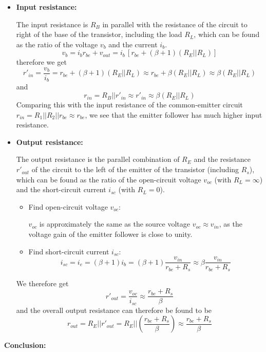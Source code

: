 \begin{itemize}
\begin{itemize}
\item {\bf Input resistance:} 

  The input resistance is $R_B$ in parallel with the resistance of the
  circuit to right of the base of the transistor, including the load 
  $R_L$, which can be found as the ratio of the voltage $v_b$ and the 
  current $i_b$. 
  \[
  v_b=i_b r_{be}+v_{out}=i_b\, [ r_{be}+(\beta+1)(R_E||R_L) ]
  \]
  therefore we get
  \[
  r'_{in}=\frac{v_b}{i_b}=r_{be}+(\beta+1) (R_E||R_L)
  \approx r_{be}+\beta (R_E||R_L)\approx \beta (R_E||R_L)
  \]
  and 
  \[
  r_{in}=R_B||r'_{in} \approx r'_{in}\approx \beta (R_E||R_L)
  \]
  Comparing this with the input resistance of the common-emitter circuit
  $r_{in}=R_1||R_2|| r_{be} \approx r_{be}$, we see that the emitter follower 
  has much higher input resistance.


\item {\bf Output resistance:}

  The output resistance is the parallel combination of $R_E$ and the 
  resistance $r'_{out}$ of the circuit to the left of the emitter of the
  transistor (including $R_s$), which can  be found as the ratio of the 
  open-circuit voltage $v_{oc}$ (with $R_L=\infty$) and the short-circuit 
  current $i_{sc}$ (with $R_L=0$). 
  \begin{itemize}
  \item Find open-circuit voltage $v_{oc}$: 

    $v_{oc}$ is approximately the same as the source voltage $v_{oc}\approx v_{in}$,
    as the voltage gain of the emitter follower is close to unity.

  \item Find short-circuit current $i_{sc}$:
    \[
    i_{sc}=i_e=(\beta+1)i_b=(\beta+1)\frac{v_{in}}{r_{be}+R_s}
    \approx \beta \frac{v_{in}}{r_{be}+R_s}
    \]
  \end{itemize}
  We therefore get
  \[
  r'_{out}=\frac{v_{oc}}{i_{sc}} \approx\frac{r_{be}+R_s}{\beta} 
  \]
  and the overall output resistance can therefore be found to be
  \[
  r_{out}= R_E || r'_{out}=R_E || \left(\frac{r_{be}+R_s}{\beta}\right)
  \approx \frac{r_{be}+R_s}{\beta}	
  \]

\end{itemize}

{\bf Conclusion:} 


\end{itemize}
